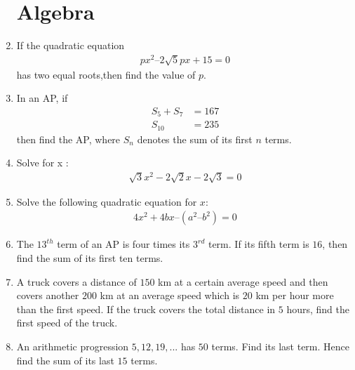 \documentclass[10pt,-letter paper]{article}
\begin{document}
\begin{enumerate}
\section{Algebra}
\item If the quadratic equation
 \begin{align*}
  px^2 – 2 \sqrt{5}px + 15 = 0
 \end{align*}
has two equal roots,then find the value of $p$.

\item In an AP, if 
\begin{align*}
 S_5 + S_7 &= 167\\  
 S_{10}&= 235
\end{align*}
then find the AP, where $S_n$ denotes the sum of its first $n$ terms.
\item Solve for x :
 \begin{align*}
     \sqrt{3}x^2 -2\sqrt{2}x-2\sqrt{3}= 0 
 \end{align*}
\item Solve the following quadratic equation for $x$:
     \begin{align*}
     4x^{2} + 4bx – (a^{2}–b^{2}) = 0
     \end{align*}
\item The $13^{th}$ term of an AP is four times its $3^{rd}$ term. If its fifth term is $16$, then find the sum of its first ten terms.
\item A truck covers a distance of $150$ km at a certain average speed and then covers another $200$ km at an average speed which is $20$ km per hour more than the first speed. If the truck covers the total distance in $5$ hours, find the first speed of the truck.
\item An arithmetic progression $5, 12, 19, ...$ has $50$ terms. Find its last term. Hence find the sum of its last $15$ terms.

\end{enumerate}
\end{document}
